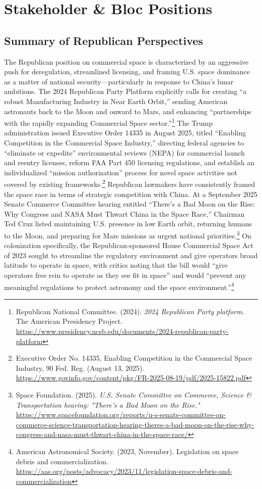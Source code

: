 \section{Stakeholder \& Bloc Positions}

\subsection{Summary of Republican Perspectives}

The Republican position on commercial space is characterized by an aggressive push for deregulation, streamlined licensing, and framing U.S. space dominance as a matter of national security—particularly in response to China’s lunar ambitions. The 2024 Republican Party Platform explicitly calls for creating “a robust Manufacturing Industry in Near Earth Orbit,” sending American astronauts back to the Moon and onward to Mars, and enhancing “partnerships with the rapidly expanding Commercial Space sector.”\footnote{Republican National Committee. (2024). \emph{2024 Republican Party platform}. The American Presidency Project. \url{https://www.presidency.ucsb.edu/documents/2024-republican-party-platform}} The Trump administration issued Executive Order 14335 in August 2025, titled “Enabling Competition in the Commercial Space Industry,” directing federal agencies to “eliminate or expedite” environmental reviews (NEPA) for commercial launch and reentry licenses, reform FAA Part 450 licensing regulations, and establish an individualized “mission authorization” process for novel space activities not covered by existing frameworks.\footnote{Executive Order No. 14335, Enabling Competition in the Commercial Space Industry, 90 Fed. Reg. (August 13, 2025). \url{https://www.govinfo.gov/content/pkg/FR-2025-08-19/pdf/2025-15822.pdf}} Republican lawmakers have consistently framed the space race in terms of strategic competition with China. At a September 2025 Senate Commerce Committee hearing entitled “There’s a Bad Moon on the Rise: Why Congress and NASA Must Thwart China in the Space Race,” Chairman Ted Cruz listed maintaining U.S. presence in low Earth orbit, returning humans to the Moon, and preparing for Mars missions as urgent national priorities.\footnote{Space Foundation. (2025). \emph{U.S. Senate Committee on Commerce, Science \& Transportation hearing: "There's a Bad Moon on the Rise."} \url{https://www.spacefoundation.org/reports/u-s-senate-committee-on-commerce-science-transportation-hearing-theres-a-bad-moon-on-the-rise-why-congress-and-nasa-must-thwart-china-in-the-space-race/}} On colonization specifically, the Republican-sponsored House Commercial Space Act of 2023 sought to streamline the regulatory environment and give operators broad latitude to operate in space, with critics noting that the bill would “give operators free rein to operate as they see fit in space” and would “prevent any meaningful regulations to protect astronomy and the space environment.”\footnote{American Astronomical Society. (2023, November). Legislation on space debris and commercialization. \url{https://aas.org/posts/advocacy/2023/11/legislation-space-debris-and-commercialization}}

